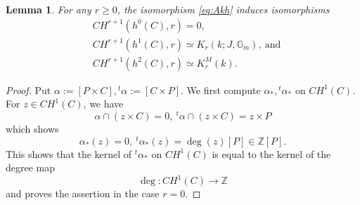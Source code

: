 \documentclass[a4paper,12pt]{amsart}
\numberwithin{equation}{section}
\newtheorem{lem}[lem]{Lemma}
\theoremstyle{definition}
\newcommand{\Gm}{\mathbb{G}_{m}}
\newcommand{\Z}{\mathbb{Z}}
\begin{document}
\begin{lem}\label{lem:decomp_CH}
	For any $r\ge 0$, the isomorphism \eqref{eq:Akh} induces isomorphisms 
    \begin{align}
    &CH^{r+1}(h^0(C),r)=0,\\
    &CH^{r+1}(h^1(C),r)\simeq K_r(k;J,\Gm),\ \text{and}\\
    &CH^{r+1}(h^2(C),r)\simeq K_r^M(k).
    \end{align}
\end{lem}
\begin{proof}
%
%
%
%
    Put $\alpha:=[P\times C], {}^t\alpha:=[C\times P]$.
    We first compute $\alpha_\ast, {}^t\alpha_\ast$ on $CH^1(C)$.
    For $z\in CH^1(C)$, we have
    $$
    \alpha\cap (z\times C)=0,\ {}^t\alpha \cap (z\times C)=z\times P
    $$
    which shows
    $$
    \alpha_\ast(z)=0,\ {}^t\alpha_\ast(z)=\deg(z)[P]\in \Z[P].
    $$
    This shows that the kernel of ${}^t\alpha_\ast$ on $CH^1(C)$ is equal to the kernel of the degree map
    $$
    \deg:CH^1(C) \to \Z
    $$ and proves the assertion in the case $r=0$.
    


\end{proof}
\end{document}
